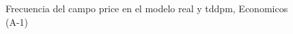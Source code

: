 \begin{figure}[H]
    \centering
    
    \caption{Frecuencia del campo  price en el modelo real y tddpm, Economicos (A-1)}
    \label{frecuency- Price-tddpm_mlp}
\end{figure}